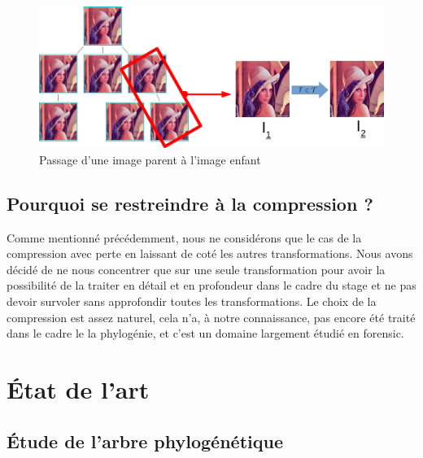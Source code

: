 \documentclass[utf8]{stageM2R} %
\begin{document}
\begin{figure}
  \begin{center}
    \includegraphics[width=120mm]{images/tree_extract}
    \caption{Passage d'une image parent à l'image enfant}
    \label{fig:tree-extract}
  \end{center}
\end{figure}

\section{Pourquoi se restreindre à la compression ?}
Comme mentionné précédemment, nous ne considérons que le cas de la compression avec perte en laissant de coté les autres transformations. Nous avons décidé de ne nous concentrer que sur une seule transformation pour avoir la possibilité de la traiter en détail et en profondeur dans le cadre du stage et ne pas devoir survoler sans approfondir toutes les transformations. Le choix de la compression est assez naturel, cela n'a, à notre connaissance, pas encore été traité dans le cadre le la phylogénie, et c'est un domaine largement étudié en forensic.

\chapter{État de l'art}
\section{Étude de l'arbre phylogénétique}
\end{document}
